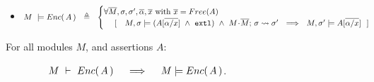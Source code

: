 \begin{definition} $~$ \\
\label{d:encaps}
\begin{itemize}
\item
$ %
    M\ \models \encaps{A}\ \   \triangleq  \ \   
    \begin{cases}
     \forall \Mtwo, \sigma, \sigma',  \overline{\alpha}, \overline{x} \mbox{ with } \overline{x}=Free(A)\\ %
   \ \ \ \  [\ \ \  \satisfiesA{M}{\sigma}{({A[{\overline {\alpha/x}}]} \ \wedge\ \externalexec)}\  \wedge\ { \leadstoBounded {M\madd\Mtwo}  {\sigma}{\sigma'}} %
   \ \ \Longrightarrow\ \ 
   {M},{\sigma'}\models{A[{\overline {\alpha/x}}]} \ \  ]
    \end{cases}
 $%
 \end{itemize}
  \end{definition}
  
 
  \begin{lemma}
\label{lem:encap-soundness}
For all modules $M$, and assertions $A$: 

$\strut \hspace{1.5cm} M\ \vdash\ {Enc(\, A\, )} \ \ \ \ \Longrightarrow\ \ \ \ M \models {\ensuremath Enc(\, A\, )}$.
\end{lemma}

